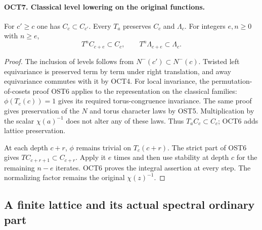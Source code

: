 \documentclass[11pt,a4paper]{article}
\numberwithin{equation}{section}
\theoremstyle{remark}\newtheorem{remark}[theorem]{Remark}
\begin{document}
\paragraph{OCT7. Classical level lowering on the original functions.}
\label{claim:OCT7}
For $c'\geq c$ one has $C_c\subset C_{c'}$.  Every $T_a$
preserves $C_c$ and $\Lambda_c$.  For integers $e,\allowbreak{} n\geq0$
with $n\geq e$,
\begin{equation}\label{eq:oct-lowering}
              T^n C_{c+e}\subset C_c,\qquad
              T^n\Lambda_{c+e}\subset\Lambda_c.
\end{equation}
\begin{proof}
The inclusion of levels follows from
$N^-(c')\subset N^-(c)$.  Twisted left equivariance is
preserved term by term under right translation, and away
equivariance commutes with it by OCT4.  For local invariance,
the permutation-of-cosets proof OST6 applies to the
representation on the classical families: $\phi(T_c(c))=1$
gives its required torus-congruence invariance.  The same
proof gives preservation of the $N$ and torus character laws
by OST5.  Multiplication by the scalar $\chi(a)^{-1}$ does
not alter any of these laws.  Thus $T_aC_c\subset C_c$;
OCT6 adds lattice preservation.

At each depth $c+r$, $\phi$ remains trivial on $T_c(c+r)$.
The strict part of OST6 gives
$T C_{c+r+1}\subset C_{c+r}$.  Apply it $e$ times and then
use stability at depth $c$ for the remaining $n-e$ iterates.
OCT6 proves the integral assertion at every step.  The
normalizing factor remains the original $\chi(z)^{-1}$.
\end{proof}

\subsection{A finite lattice and its actual spectral ordinary part}

\end{document}
